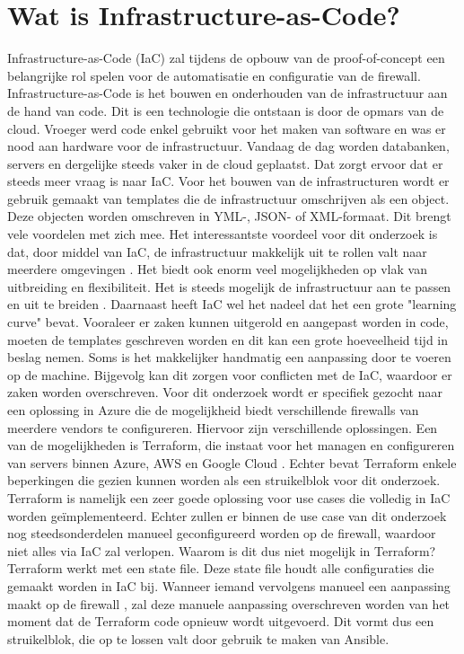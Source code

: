 \section{Wat is Infrastructure-as-Code?}
Infrastructure-as-Code (IaC) zal tijdens de opbouw van de proof-of-concept een belangrijke rol spelen voor de automatisatie en configuratie van de firewall. Infrastructure-as-Code is het bouwen en onderhouden van de infrastructuur aan de hand van code. Dit is een technologie die ontstaan is door de opmars van de cloud. Vroeger werd code enkel gebruikt voor het maken van software en was er nood aan hardware voor de infrastructuur. Vandaag de dag worden databanken, servers en dergelijke steeds vaker in de cloud geplaatst. Dat zorgt ervoor dat er steeds meer vraag is naar IaC. Voor het bouwen van de infrastructuren wordt er gebruik gemaakt van templates die de infrastructuur omschrijven als een object. Deze objecten worden omschreven in YML-, JSON- of XML-formaat. Dit brengt vele voordelen met zich mee. Het interessantste voordeel voor dit onderzoek is dat, door middel van IaC, de infrastructuur makkelijk uit te rollen valt naar meerdere omgevingen \autocite{Bulthuis}. Het biedt ook enorm veel mogelijkheden op vlak van uitbreiding en flexibiliteit. Het is steeds mogelijk de infrastructuur aan te passen en uit te breiden \autocite{Morris2016}. Daarnaast heeft IaC wel het nadeel dat het een grote "learning curve" bevat. Vooraleer er zaken kunnen uitgerold en aangepast worden in code, moeten de templates geschreven worden en dit kan een grote hoeveelheid tijd in beslag nemen. Soms is het makkelijker handmatig een aanpassing door te voeren op de machine. Bijgevolg kan dit zorgen voor conflicten met de IaC, waardoor er zaken worden overschreven. Voor dit onderzoek wordt er specifiek gezocht naar een oplossing in Azure die de mogelijkheid biedt verschillende firewalls van meerdere vendors te configureren. 
Hiervoor zijn verschillende oplossingen. Een van de mogelijkheden is Terraform, die instaat voor het managen en configureren van servers binnen Azure, AWS en Google Cloud \autocite{IONOS2019} \autocite{Janashia2020}. Echter bevat Terraform enkele beperkingen die gezien kunnen worden als een struikelblok voor dit onderzoek. Terraform is namelijk een zeer goede oplossing voor use cases die volledig in IaC worden geïmplementeerd. Echter zullen er binnen de use case van dit onderzoek nog steedsonderdelen manueel geconfigureerd worden op de firewall, waardoor niet alles via IaC zal verlopen. Waarom is dit dus niet mogelijk in Terraform? Terraform werkt met een state file. Deze state file houdt alle configuraties die gemaakt worden in IaC bij. Wanneer iemand vervolgens manueel een aanpassing maakt op de firewall , zal deze manuele aanpassing overschreven worden van het moment dat de Terraform code opnieuw wordt uitgevoerd. Dit vormt dus een struikelblok, die op te lossen valt door gebruik te maken van Ansible.  \autocite{Anthony}

